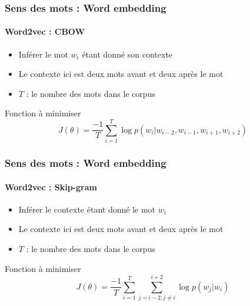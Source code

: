 \documentclass[xcolor=table]{beamer}
\begin{document}
\begin{frame}
	\frametitle{Sens des mots : Word embedding}
	\framesubtitle{Word2vec : CBOW}
\begin{minipage}{.6\textwidth}
	\begin{itemize}
		\item Inférer le mot $w_i$ étant donné son contexte
		\item Le contexte ici est deux mots avant et deux après le mot
		\item $T$ : le nombre des mots dans le corpus
	\end{itemize}
	\begin{block}{Fonction à minimiser}
		\[%
		J(\theta) = \frac{-1}{T} \sum_{i=1}^{T} \log p(w_i |w_{i-2}, w_{i-1}, w_{i+1}, w_{i+2})
		\]
	\end{block}
\end{minipage}
\begin{minipage}{.08\textwidth}
\end{minipage}	
\begin{minipage}{.38\textwidth}
\end{minipage}
	
\end{frame}

\begin{frame}
	\frametitle{Sens des mots : Word embedding}
	\framesubtitle{Word2vec : Skip-gram}
	\begin{minipage}{.58\textwidth}
		\begin{itemize}
			\item Inférer le contexte étant donné le mot $w_i$
			\item Le contexte ici est deux mots avant et deux après le mot
			\item $T$ : le nombre des mots dans le corpus
		\end{itemize}
		\begin{block}{Fonction à minimiser}
			\[%
			J(\theta) = \frac{-1}{T} \sum_{i=1}^{T} \sum_{j= i-2; j \ne i}^{i+2} \log p(w_j |w_i)
			\]
		\end{block}
	\end{minipage}
	\begin{minipage}{.08\textwidth}
	\end{minipage}
	\begin{minipage}{.4\textwidth}
	\end{minipage}
	
\end{frame}
\end{document}
